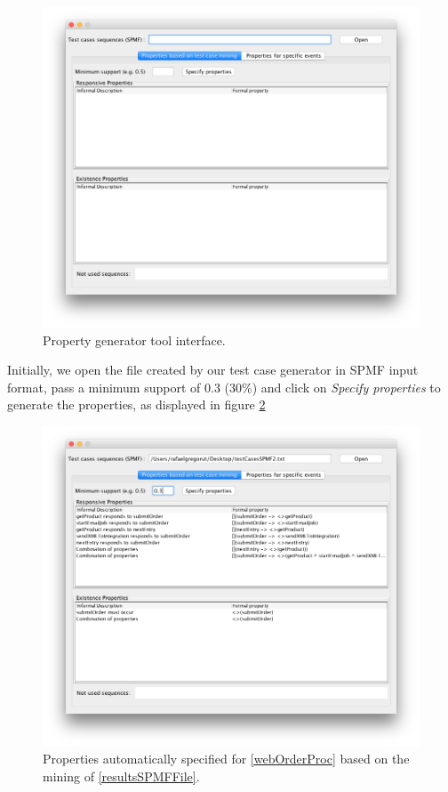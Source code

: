 \begin{figure}[htb]
\centering
\includegraphics[width=\textwidth]{figuras/propGenClean}
\caption{\label{propGenClean} Property generator tool interface.}
\end{figure}

Initially, we open the file created by our test case generator in SPMF input format, pass a minimum support of 0.3 ($30\%$) and click on \textit{Specify properties} to generate the properties, as displayed in figure \ref{propGenMining}

\begin{figure}[htb]
\centering
\includegraphics[width=\textwidth]{figuras/propGenMining}
\caption{\label{propGenMining} Properties automatically specified for \ref{webOrderProc} based on the mining of \ref{resultsSPMFFile}.}
\end{figure}

